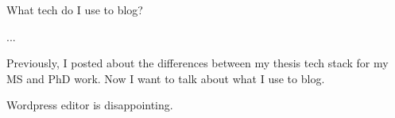 What tech do I use to blog?

...

Previously, I posted about the differences between my thesis tech stack for my MS and PhD work. Now I want to talk about what I use to blog.

Wordpress editor is disappointing.